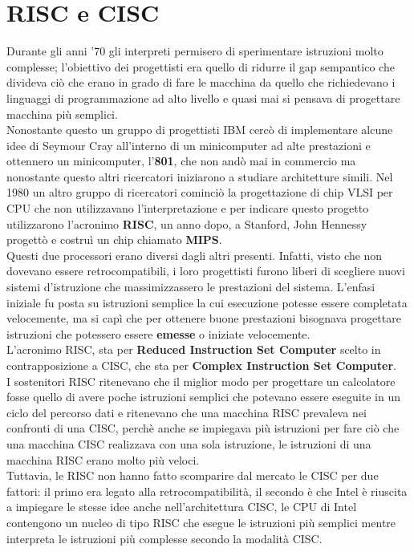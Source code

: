 \documentclass[12pt]{report}
\begin{document}
\section{RISC e CISC}
Durante gli anni '70 gli interpreti permisero di sperimentare istruzioni molto complesse; l'obiettivo dei progettisti era quello di ridurre il gap sempantico che divideva ciò che erano in grado di fare le macchina da quello che richiedevano i linguaggi di programmazione ad alto livello e quasi mai si pensava di progettare macchina più semplici. \\
Nonostante questo un gruppo di progettisti IBM cercò di implementare alcune idee di Seymour Cray all'interno di un minicomputer ad alte prestazioni e ottennero un minicomputer, l'\textbf{801}, che non andò mai in commercio ma nonostante questo altri ricercatori iniziarono a studiare architetture simili. Nel 1980 un altro gruppo di ricercatori cominciò la progettazione di chip VLSI per CPU che non utilizzavano l'interpretazione e per indicare questo progetto utilizzarono l'acronimo \textbf{RISC}, un anno dopo, a Stanford, John Hennessy progettò e costruì un chip chiamato \textbf{MIPS}. \\
Questi due processori erano diversi dagli altri presenti. Infatti, visto che non dovevano essere retrocompatibili, i loro progettisti furono liberi di scegliere nuovi sistemi d'istruzione che massimizzassero le prestazioni del sistema. L'enfasi iniziale fu posta su istruzioni semplice la cui esecuzione potesse essere completata velocemente, ma si capì che per ottenere buone prestazioni bisognava progettare istruzioni che potessero essere \textbf{emesse} o iniziate velocemente. \\
L'acronimo RISC, sta per \textbf{Reduced Instruction Set Computer} scelto in contrapposizione a CISC, che sta per \textbf{Complex Instruction Set Computer}. \\
I sostenitori RISC ritenevano che il miglior modo per progettare un calcolatore fosse quello di avere poche istruzioni semplici che potevano essere eseguite in un ciclo del percorso dati e ritenevano che una macchina RISC prevaleva nei confronti di una CISC, perchè anche se impiegava più istruzioni per fare ciò che una macchina CISC realizzava con una sola istruzione, le istruzioni di una macchina RISC erano molto più veloci. \\
Tuttavia, le RISC non hanno fatto scomparire dal mercato le CISC per due fattori: il primo era legato alla retrocompatibilità, il secondo è che Intel è riuscita a impiegare le stesse idee anche nell'architettura CISC, le CPU di Intel contengono un nucleo di tipo RISC che esegue le istruzioni più semplici mentre interpreta le istruzioni più complesse secondo la modalità CISC.
\end{document}
